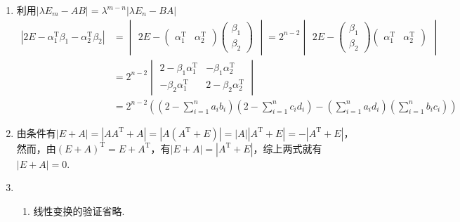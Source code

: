 \begin{enumerate}
  \item 利用$|\lambda E_m-AB|=\lambda^{m-n}|\lambda E_n-BA|$
        \begin{align*}
            |2E-\alpha_1^\mathrm{T}\beta_1-\alpha_2^\mathrm{T}\beta_2|
             & =\begin{vmatrix}
                    2E-\begin{pmatrix}
                       \alpha_1^\mathrm{T} & \alpha_2^\mathrm{T}
                   \end{pmatrix}\begin{pmatrix}
                                    \beta_1 \\\beta_2
                                \end{pmatrix}
                \end{vmatrix}
            =2^{n-2}\begin{vmatrix}
                        2E-\begin{pmatrix}
                       \beta_1 \\\beta_2
                   \end{pmatrix}\begin{pmatrix}
                                    \alpha_1^\mathrm{T} & \alpha_2^\mathrm{T}
                                \end{pmatrix}
                    \end{vmatrix}         \\
             & =2^{n-2}\begin{vmatrix}
                           2-\beta_1\alpha_1^\mathrm{T} & -\beta_1\alpha_2^\mathrm{T}  \\
                           -\beta_2\alpha_1^\mathrm{T}  & 2-\beta_2\alpha_2^\mathrm{T}
                       \end{vmatrix} \\
             & =2^{n-2}
            \left(\left(2-\sum_{i=1}^na_ib_i\right)
            \left(2-\sum_{i=1}^nc_id_i\right)
            -\left(\sum_{i=1}^na_id_i\right)
            \left(\sum_{i=1}^nb_ic_i\right)\right)
        \end{align*}

  \item 由条件有$|E+A|=|AA^\mathrm{T}+A|=|A(A^\mathrm{T}+E)|=|A||A^\mathrm{T}+E|=-|A^\mathrm{T}+E|$，然而，由$(E+A)^\mathrm{T}=E+A^\mathrm{T}$，有$|E+A|=|A^\mathrm{T}+E|$，综上两式就有$|E+A|=0$.

    \item \begin{enumerate}
              \item 线性变换的验证省略.


\end{enumerate}
\end{enumerate}
